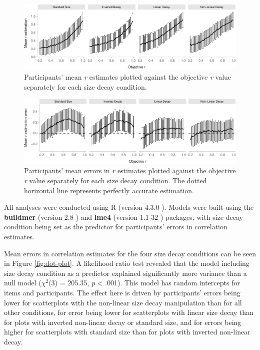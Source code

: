 \documentclass{vgtc}                          %
\begin{document}
\begin{figure}[h]

{\centering \includegraphics[width=1\linewidth]{size_and_scatterplots_files/figure-latex/error-plot-1} 

}

\caption{Participants' mean \textit{r} estimates plotted against the objective \textit{r} value separately for each size decay condition.}\label{fig:error-plot}
\end{figure}

\begin{figure}

{\centering \includegraphics[width=1\linewidth]{size_and_scatterplots_files/figure-latex/changes-with-r-size-1} 

}

\caption{Participants' mean errors in \textit{r} estimates plotted against the objective \textit{r} value separately for each size decay condition. The dotted horizontal line represents perfectly accurate estimation.}\label{fig:changes-with-r-size}
\end{figure}

All analyses were conducted using R (version 4.3.0 \cite{r_core}). Models were
built using the \textbf{buildmer} (version 2.8 \cite{voeten_buildmer}) and \textbf{lme4}
(version 1.1-32 \cite{bates_lme4_2015}) packages, with size decay condition being set
as the predictor for participants' errors in correlation estimates.

Mean errors in correlation estimates for the four size decay conditions
can be seen in Figure \ref{fig:dot-plot}. A likelihood ratio test revealed that the
model including size decay condition as a predictor explained significantly more
variance than a null model (\(\chi^2\)(3) = 205.35,
\emph{p} \textless{} .001). This model has random intercepts for
items and participants. The effect here is driven by participants' errors being lower
for scatterplots with the non-linear size decay manipulation than for all other conditions,
for error being lower for scatterplots with linear size decay than for plots with
inverted non-linear decay or standard size, and for errors being higher for scatterplots
with standard size than for plots with inverted non-linear decay.
\end{document}
